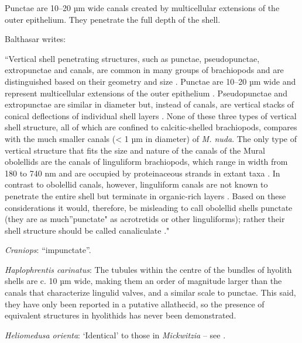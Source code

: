\documentclass[openany]{book}
\theoremstyle{definition}
\theoremstyle{definition}
\theoremstyle{definition}
\theoremstyle{remark}
\begin{document}
Punctae are 10--20 µm wide canals created by multicellular extensions of
the outer epithelium. They penetrate the full depth of the shell.

Balthasar \citeyearpar{Balthasar2008iMummpikia} writes:

``Vertical shell penetrating structures, such as punctae, pseudopunctae,
extropunctae and canals, are common in many groups of brachiopods and
are distinguished based on their geometry and size
\citep{Williams1997Introduction}. Punctae are 10--20 µm wide and
represent multicellular extensions of the outer epithelium
\citep{Owen1969Thecaecum}. Pseudopunctae and extropunctae are similar in
diameter but, instead of canals, are vertical stacks of conical
deflections of individual shell layers \citep{Williams1993Roleof}. None
of these three types of vertical shell structure, all of which are
confined to calcitic-shelled brachiopods, compares with the much smaller
canals (\textless{} 1 µm in diameter) of \emph{M. nuda}. The only type
of vertical structure that fits the size and nature of the canals of the
Mural obolellids are the canals of linguliform brachiopods, which range
in width from 180 to 740 nm and are occupied by proteinaceous strands in
extant taxa
\citep{Williams1992Structureof, Williams1994Collagenouschitino, Williams1997Introduction}.
In contrast to obolellid canals, however, linguliform canals are not
known to penetrate the entire shell but terminate in organic-rich layers
\citep{Williams1997Introduction}. Based on these considerations it
would, therefore, be misleading to call obolellid shells punctate (they
are as much''punctate" as acrotretids or other linguliforms); rather
their shell structure should be called canaliculate
\citep{Williams1997Introduction}."

\hypertarget{Craniops-coding-128}{}
\emph{Craniops}: ``impunctate''.

\hypertarget{Haplophrentis_carinatus-coding-128}{}
\emph{Haplophrentis carinatus}: The tubules within the centre of the
bundles of hyolith shells \citep{Kouchinsky2000Skeletalmicrostructures}
are c. 10 µm wide, making them an order of magnitude larger than the
canals that characterize lingulid valves, and a similar scale to
punctae. This said, they have only been reported in a putative
allathecid, so the presence of equivalent structures in hyolithids has
never been demonstrated.

\hypertarget{Heliomedusa_orienta-coding-128}{}
\emph{Heliomedusa orienta}: `Identical' to those in \emph{Mickwitzia} --
see \citet{Williams2007Supplement}.
\end{document}
